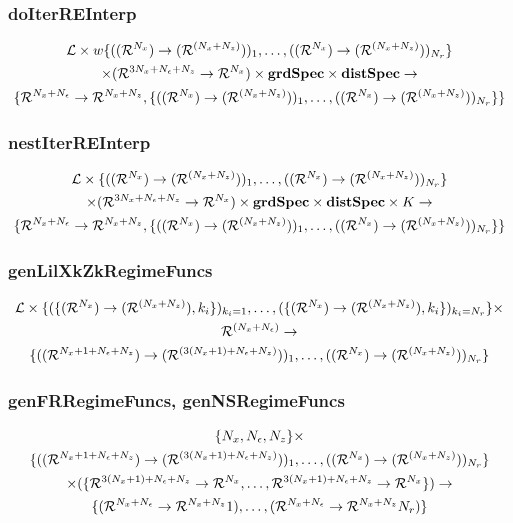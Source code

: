 \documentclass[tikz]{beamer}
\begin{document}
\begin{frame}
\frametitle{doIterREInterp}
\label{sec:doiterreinterp}

\begin{gather*}
  \linMod \times 
w\{(\xzFuncGuessSig)_1,\ldots,(\xzFuncGuessSig)_{\numR}\}  \\
 \times (\eqnFuncSig ) \times \grdSpec \times \dstSpec \rightarrow\\
\{\frfpnsFuncSig, \{(\xzFuncGuessSig)_1,\ldots,(\xzFuncGuessSig)_{\numR}\}\}
\end{gather*}



\end{frame}



\begin{frame}
\frametitle{nestIterREInterp}
\label{sec:nestiterreinterp}



\begin{gather*}
  \linMod \times 
\{(\xzFuncGuessSig)_1,\ldots,(\xzFuncGuessSig)_{\numR}\}  \\
 \times (\eqnFuncSig ) \times \grdSpec \times \dstSpec \times \numIters \rightarrow\\
\{\frfpnsFuncSig, \{(\xzFuncGuessSig)_1,\ldots,(\xzFuncGuessSig)_{\numR}\}\}
\end{gather*}



\end{frame}


\begin{frame}
\frametitle{genLilXkZkRegimeFuncs}
\label{sec:genlilxkzkregimefunc}
{\small
\begin{gather*}
\linMod \times \{(\{  \bigXFuncSig, k_i \})_{k_i=1},\ldots,(\{  \bigXFuncSig, k_i \})_{k_i=\numR}\} \times\\ \Rn{(\numX+\numEps)} \rightarrow\\
\{(\lilXRegimeFuncSig)_1,\ldots,(\xzFuncGuessSig)_{\numR}\}
\end{gather*}
}





\end{frame}


\begin{frame}
\frametitle{genFRRegimeFuncs, genNSRegimeFuncs}
\label{sec:genfrregimefunc}



{\small
\begin{gather*}
\{\numX,\numEps,\numZ\}\times\\
\{(\lilXRegimeFuncSig)_1,\ldots,(\xzFuncGuessSig)_{\numR}\}  \\
 \times (\eqnRegimeFuncSig )\rightarrow\\
\frfpnsRegimeFuncSig
\end{gather*}
}








\end{frame}
\end{document}
